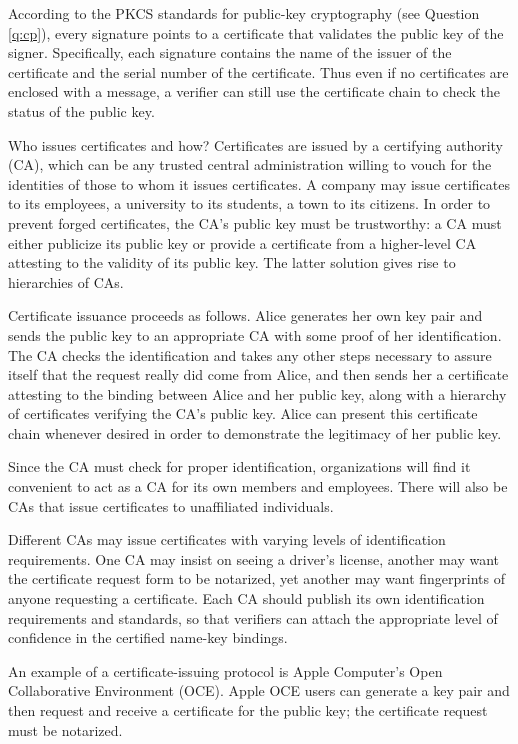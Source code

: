 According to the PKCS standards for public-key cryptography (see Question
\ref{q:cp}), every signature points to a certificate that validates
the public key of the signer. Specifically, each signature contains the name 
of the issuer of the certificate and the serial number of the certificate. 
Thus even if no certificates are enclosed with a message, a verifier can 
still use the certificate chain to check the status of the public key.

{Who issues certificates and how?}
Certificates are issued by a certifying authority (CA), which can be any 
trusted central administration willing to vouch for the identities of those 
to whom it issues certificates. A company may issue certificates to its 
employees, a university to its students, a town to its citizens. In 
order to prevent forged certificates, the CA's public key must be trustworthy: 
a CA must either publicize its public key or provide a certificate from a 
higher-level CA attesting to the validity of its public key. The latter
solution gives rise to hierarchies of CAs.

Certificate issuance proceeds as follows. Alice generates her own key 
pair and sends the public key to an appropriate CA with some proof of her 
identification. The CA checks the identification and takes any other steps
necessary to assure itself that the request really did come from Alice, and 
then sends her a certificate attesting to the binding between Alice and her 
public key, along with a hierarchy of certificates verifying the CA's public 
key. Alice can present this certificate chain whenever desired in order to 
demonstrate the legitimacy of her public key. 

Since the CA must check for proper identification, organizations will find 
it convenient to act as a CA for its own members and employees. There will 
also be CAs that issue certificates to unaffiliated individuals.

Different CAs may issue certificates with varying levels of identification 
requirements. One CA may insist on seeing a driver's license, another may 
want the certificate request form to be notarized, yet another may want 
fingerprints of anyone requesting a certificate. Each CA should publish 
its own identification requirements and standards, so that verifiers 
can attach the appropriate level of confidence in the certified name-key 
bindings.

An example of a certificate-issuing protocol is Apple Computer's Open 
Collaborative Environment (OCE). Apple OCE users can generate a key 
pair and then request and receive a certificate for the public key; the
certificate request must be notarized.

